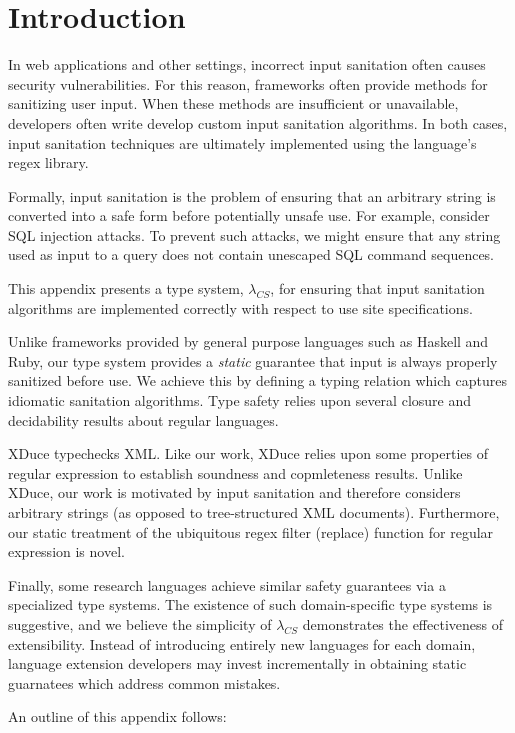 \documentclass[10pt,preprint]{sigplanconf}
\theoremstyle{definition}
\newcommand{\lcs}{\lambda_{CS}}
\begin{document}
\section{Introduction}
In web applications and other settings, incorrect input sanitation often causes
security vulnerabilities. For this reason, frameworks often provide methods
for sanitizing user input. When these methods are insufficient or unavailable,
developers often write develop custom input sanitation algorithms. In both cases,
input sanitation techniques are ultimately implemented using the language's
regex library.

Formally, input sanitation is the problem of ensuring that an arbitrary string
is converted into a safe form before potentially unsafe use. For example, consider
SQL injection attacks. To prevent such attacks, we might ensure that any string
used as input to a query does not contain unescaped SQL command sequences. 

This appendix presents a type system, $\lcs$, for ensuring that input 
sanitation algorithms are implemented correctly with respect to use site 
specifications.

Unlike frameworks provided by general purpose languages such as Haskell and
Ruby, our type system provides a \emph{static} guarantee that input is always 
properly sanitized before use. We achieve this by defining a typing relation
which captures idiomatic sanitation algorithms. Type safety relies upon 
several closure and decidability results about regular languages.

XDuce typechecks XML. Like our work, XDuce relies upon some properties of
regular expression to establish soundness and copmleteness results. Unlike
XDuce, our work is motivated by input sanitation and therefore considers arbitrary
strings (as opposed to tree-structured XML documents). Furthermore, our static
treatment of the ubiquitous regex filter (replace) function for regular expression is novel.

Finally, some research languages achieve similar safety guarantees via a specialized type
systems. The existence of such domain-specific type systems is suggestive, and 
we believe the simplicity of $\lcs$ demonstrates the effectiveness of
extensibility. Instead of introducing entirely new languages for each domain,
language extension developers may invest incrementally in obtaining static
guarnatees which address common mistakes.

An outline of this appendix follows:
\end{document}
